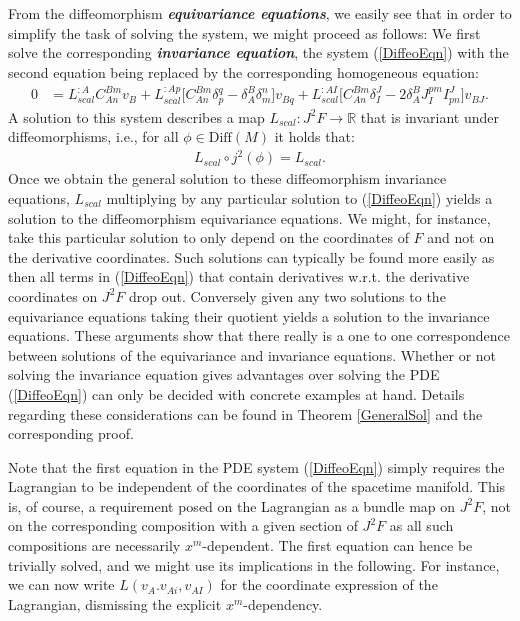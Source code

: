 From the diffeomorphism \textit{\textbf{equivariance equations}}, we easily see that in order to simplify the task of solving the system, we might proceed as follows:
We first solve the corresponding \textit{\textbf{invariance equation}}, the system (\ref{DiffeoEqn}) with the second equation being replaced by the corresponding homogeneous equation:
\begin{align}
    0 &= L_{scal}^{:A} C_{An}^{Bm} v_B + L_{scal}^{:Ap} \bigl[ C_{An}^{Bm} \delta_p^q - \delta_A^B \delta_m^n \bigr] v_{Bq} + L_{scal}^{:AI} \bigl[ C_{An}^{Bm} \delta_I^J - 2 \delta_A^B J_I^{pm} I^J_{pn}  \bigr] v_{BJ}.
\end{align}
A solution to this system describes a map $L_{scal}: J^2F \rightarrow \mathbb{R}$ that is invariant under diffeomorphisms, i.e., for all $\phi \in \mathrm{Diff}(M)$ it holds that:
\begin{align}
    L_{scal} \circ j^2(\phi) = L_{scal}.
\end{align}
Once we obtain the general solution to these diffeomorphism invariance equations, $L_{scal}$ multiplying by any particular solution to (\ref{DiffeoEqn}) yields a solution to the diffeomorphism equivariance equations. We might, for instance, take this particular solution to only depend on the coordinates of $F$ and not on the derivative coordinates. Such solutions can typically be found more easily as then all terms in (\ref{DiffeoEqn}) that contain derivatives w.r.t. the derivative coordinates on $J^2F$ drop out. Conversely given any two solutions to the equivariance equations taking their quotient yields a solution to the invariance equations. These arguments show that there really is a one to one correspondence between solutions of the equivariance and invariance equations. Whether or not solving the invariance equation gives advantages over solving the PDE (\ref{DiffeoEqn}) can only be decided with concrete examples at hand. Details regarding these considerations can be found in Theorem \ref{GeneralSol} and the corresponding proof. 

Note that the first equation in the PDE system (\ref{DiffeoEqn}) simply requires the Lagrangian to be independent of the coordinates of the spacetime manifold. This is, of course, a requirement posed on the Lagrangian as a bundle map on $J^2F$, not on the corresponding composition with a given section of $J^2F$ as all such compositions are necessarily $x^m$-dependent. The first equation can hence be trivially solved, and we might use its implications in the following. For instance, we can now write $L(v_A.v_{Ai},v_{AI})$ for the coordinate expression of the Lagrangian, dismissing the explicit $x^m$-dependency.

